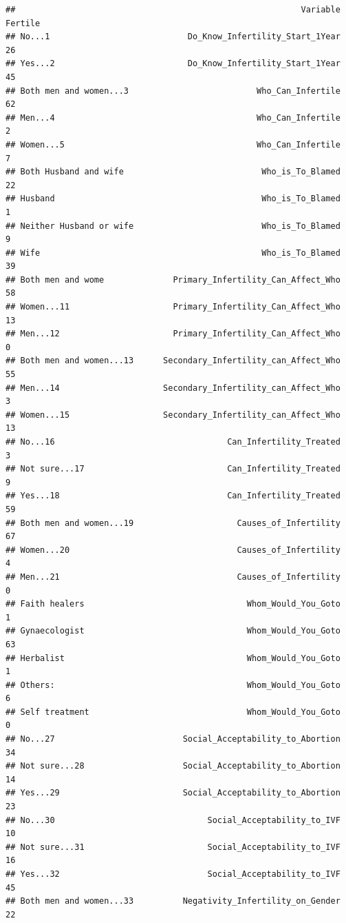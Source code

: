 \documentclass[
]{article}
\begin{document}
\begin{verbatim}
##                                                          Variable Fertile
## No...1                            Do_Know_Infertility_Start_1Year      26
## Yes...2                           Do_Know_Infertility_Start_1Year      45
## Both men and women...3                          Who_Can_Infertile      62
## Men...4                                         Who_Can_Infertile       2
## Women...5                                       Who_Can_Infertile       7
## Both Husband and wife                            Who_is_To_Blamed      22
## Husband                                          Who_is_To_Blamed       1
## Neither Husband or wife                          Who_is_To_Blamed       9
## Wife                                             Who_is_To_Blamed      39
## Both men and wome              Primary_Infertility_Can_Affect_Who      58
## Women...11                     Primary_Infertility_Can_Affect_Who      13
## Men...12                       Primary_Infertility_Can_Affect_Who       0
## Both men and women...13      Secondary_Infertility_can_Affect_Who      55
## Men...14                     Secondary_Infertility_can_Affect_Who       3
## Women...15                   Secondary_Infertility_can_Affect_Who      13
## No...16                                   Can_Infertility_Treated       3
## Not sure...17                             Can_Infertility_Treated       9
## Yes...18                                  Can_Infertility_Treated      59
## Both men and women...19                     Causes_of_Infertility      67
## Women...20                                  Causes_of_Infertility       4
## Men...21                                    Causes_of_Infertility       0
## Faith healers                                 Whom_Would_You_Goto       1
## Gynaecologist                                 Whom_Would_You_Goto      63
## Herbalist                                     Whom_Would_You_Goto       1
## Others:                                       Whom_Would_You_Goto       6
## Self treatment                                Whom_Would_You_Goto       0
## No...27                          Social_Acceptability_to_Abortion      34
## Not sure...28                    Social_Acceptability_to_Abortion      14
## Yes...29                         Social_Acceptability_to_Abortion      23
## No...30                               Social_Acceptability_to_IVF      10
## Not sure...31                         Social_Acceptability_to_IVF      16
## Yes...32                              Social_Acceptability_to_IVF      45
## Both men and women...33          Negativity_Infertility_on_Gender      22

\end{verbatim}
\end{document}

